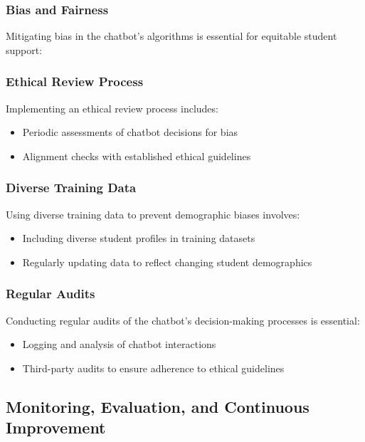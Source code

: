 \documentclass[14pt,a4paper]{article}
\begin{document}
\begin{multicols}{2}
\subsubsection{Bias and Fairness}
Mitigating bias in the chatbot's algorithms is essential for equitable student support:

\subsubsection*{Ethical Review Process}
Implementing an ethical review process \textit{\parencite{FloridiCowls2023}} includes:
\begin{itemize}
    \item Periodic assessments of chatbot decisions for bias
    \item Alignment checks with established ethical guidelines
\end{itemize}

\subsubsection{Diverse Training Data}
Using diverse training data to prevent demographic biases \textit{\parencite[pp. 1-35]{Mehrabi2023}} involves:
\begin{itemize}
    \item Including diverse student profiles in training datasets
    \item Regularly updating data to reflect changing student demographics
\end{itemize}

\subsubsection{Regular Audits}
Conducting regular audits of the chatbot's decision-making processes \textit{\parencite{AIEthicsGuidelines2024}} is essential:
\begin{itemize}
    \item Logging and analysis of chatbot interactions
    \item Third-party audits to ensure adherence to ethical guidelines
\end{itemize}


\subsection{Monitoring, Evaluation, and Continuous Improvement}

\end{multicols}
\end{document}
